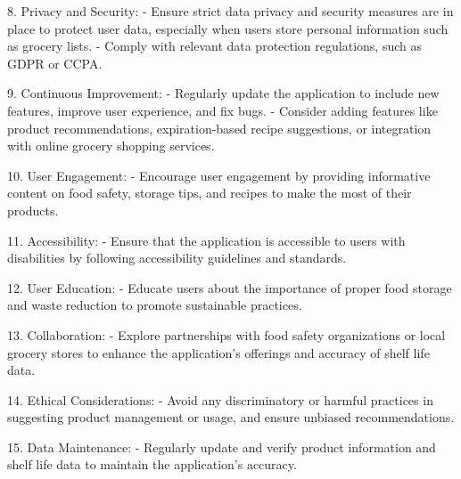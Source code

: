 8. Privacy and Security:
   - Ensure strict data privacy and security measures are in place to protect user data, especially when users store personal information such as grocery lists.
   - Comply with relevant data protection regulations, such as GDPR or CCPA.

9. Continuous Improvement:
   - Regularly update the application to include new features, improve user experience, and fix bugs.
   - Consider adding features like product recommendations, expiration-based recipe suggestions, or integration with online grocery shopping services.

10. User Engagement:
    - Encourage user engagement by providing informative content on food safety, storage tips, and recipes to make the most of their products.

11. Accessibility:
    - Ensure that the application is accessible to users with disabilities by following accessibility guidelines and standards.

12. User Education:
    - Educate users about the importance of proper food storage and waste reduction to promote sustainable practices.

13. Collaboration:
    - Explore partnerships with food safety organizations or local grocery stores to enhance the application's offerings and accuracy of shelf life data.

14. Ethical Considerations:
    - Avoid any discriminatory or harmful practices in suggesting product management or usage, and ensure unbiased recommendations.

15. Data Maintenance:
    - Regularly update and verify product information and shelf life data to maintain the application's accuracy.